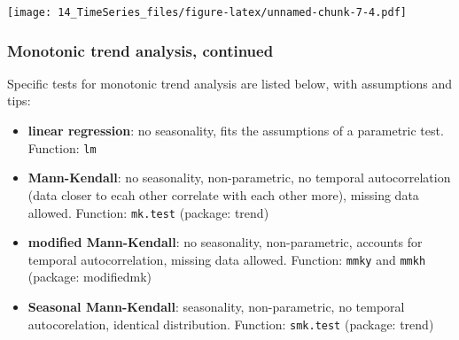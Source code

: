 \documentclass[
]{article}
\newenvironment{Shaded}{\begin{snugshade}}{\end{snugshade}}
\newcommand{\CommentTok}[1]{\textcolor[rgb]{0.56,0.35,0.01}{\textit{#1}}}
\newcommand{\DataTypeTok}[1]{\textcolor[rgb]{0.13,0.29,0.53}{#1}}
\newcommand{\FloatTok}[1]{\textcolor[rgb]{0.00,0.00,0.81}{#1}}
\newcommand{\KeywordTok}[1]{\textcolor[rgb]{0.13,0.29,0.53}{\textbf{#1}}}
\newcommand{\NormalTok}[1]{#1}
\newcommand{\OperatorTok}[1]{\textcolor[rgb]{0.81,0.36,0.00}{\textbf{#1}}}
\newcommand{\StringTok}[1]{\textcolor[rgb]{0.31,0.60,0.02}{#1}}
\providecommand{\tightlist}{%
  \setlength{\itemsep}{0pt}\setlength{\parskip}{0pt}}
\begin{document}
\begin{Shaded}
\end{Shaded}

\texttt{[image: 14\_TimeSeries\_files/figure-latex/unnamed-chunk-7-4.pdf]}

\hypertarget{monotonic-trend-analysis-continued}{%
\subsubsection{Monotonic trend analysis,
continued}\label{monotonic-trend-analysis-continued}}

Specific tests for monotonic trend analysis are listed below, with
assumptions and tips:

\begin{itemize}
\tightlist
\item
  \textbf{linear regression}: no seasonality, fits the assumptions of a
  parametric test. Function: \texttt{lm}
\item
  \textbf{Mann-Kendall}: no seasonality, non-parametric, no temporal
  autocorrelation (data closer to ecah other correlate with each other
  more), missing data allowed. Function: \texttt{mk.test} (package:
  trend)
\item
  \textbf{modified Mann-Kendall}: no seasonality, non-parametric,
  accounts for temporal autocorrelation, missing data allowed. Function:
  \texttt{mmky} and \texttt{mmkh} (package: modifiedmk)
\item
  \textbf{Seasonal Mann-Kendall}: seasonality, non-parametric, no
  temporal autocorelation, identical distribution. Function:
  \texttt{smk.test} (package: trend)
\end{itemize}
\end{document}
